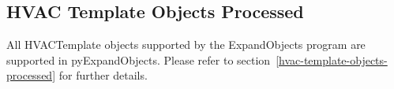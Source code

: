 \subsection{HVAC Template Objects Processed}\label{pyexpandobjects-hvac-template-objects-processed}

All HVACTemplate objects supported by the ExpandObjects program are supported in pyExpandObjects.  Please refer to section~\ref{hvac-template-objects-processed} for further details.